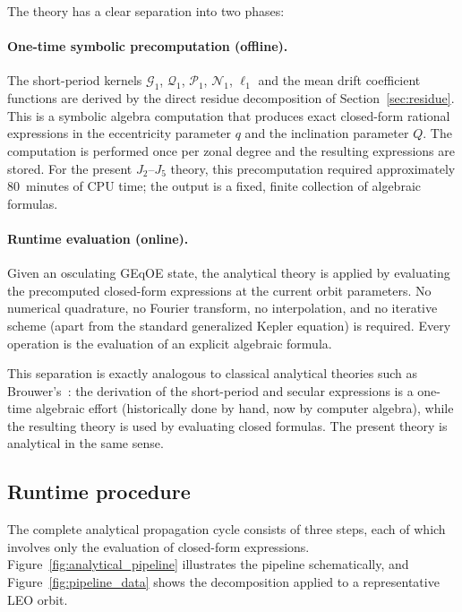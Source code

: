 \documentclass[11pt]{article}
\begin{document}
The theory has a clear separation into two phases:

\paragraph{One-time symbolic precomputation (offline).}
The short-period kernels $\mathcal{G}_1$, $\mathcal{Q}_1$,
$\mathcal{P}_1$, $\mathcal{N}_1$, $\ell_1$ and the mean drift coefficient
functions are derived by the direct residue decomposition of
Section~\ref{sec:residue}. This is a symbolic algebra computation that
produces exact closed-form rational expressions in the eccentricity parameter
$q$ and the inclination parameter $Q$. The computation is performed once per
zonal degree and the resulting expressions are stored. For the present
$J_2$--$J_5$ theory, this precomputation required approximately 80~minutes
of CPU time; the output is a fixed, finite collection of algebraic formulas.

\paragraph{Runtime evaluation (online).}
Given an osculating GEqOE state, the analytical theory is applied by
evaluating the precomputed closed-form expressions at the current orbit
parameters. No numerical quadrature, no Fourier transform, no interpolation,
and no iterative scheme (apart from the standard generalized Kepler equation)
is required. Every operation is the evaluation of an explicit algebraic
formula.

This separation is exactly analogous to classical analytical theories such as
Brouwer's~\cite{brouwer1959}: the derivation of the short-period and secular
expressions is a one-time algebraic effort (historically done by hand, now by
computer algebra), while the resulting theory is used by evaluating closed
formulas. The present theory is analytical in the same sense.

\subsection{Runtime procedure}

The complete analytical propagation cycle consists of three steps, each of
which involves only the evaluation of closed-form expressions.
Figure~\ref{fig:analytical_pipeline} illustrates the pipeline schematically,
and Figure~\ref{fig:pipeline_data} shows the decomposition applied to a
representative LEO orbit.
\end{document}
